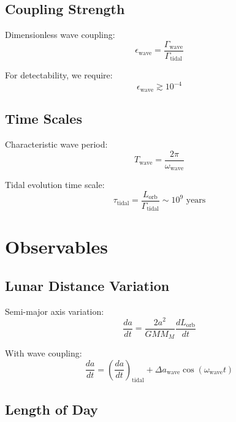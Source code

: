 \documentclass[12pt,a4paper]{article}
\begin{document}
\subsection{Coupling Strength}

Dimensionless wave coupling:
\begin{equation}
\epsilon_{\text{wave}} = \frac{\Gamma_{\text{wave}}}{\Gamma_{\text{tidal}}}
\label{eq:coupling_strength}
\end{equation}

For detectability, we require:
\begin{equation}
\epsilon_{\text{wave}} \gtrsim 10^{-4}
\label{eq:detectability}
\end{equation}

\subsection{Time Scales}

Characteristic wave period:
\begin{equation}
T_{\text{wave}} = \frac{2\pi}{\omega_{\text{wave}}}
\label{eq:wave_period}
\end{equation}

Tidal evolution time scale:
\begin{equation}
\tau_{\text{tidal}} = \frac{L_{\text{orb}}}{\Gamma_{\text{tidal}}} \sim 10^9 \text{ years}
\label{eq:tidal_timescale}
\end{equation}

\section{Observables}

\subsection{Lunar Distance Variation}

Semi-major axis variation:
\begin{equation}
\frac{da}{dt} = \frac{2a^2}{GMM_M} \frac{dL_{\text{orb}}}{dt}
\label{eq:distance_variation}
\end{equation}

With wave coupling:
\begin{equation}
\frac{da}{dt} = \left(\frac{da}{dt}\right)_{\text{tidal}} + \Delta a_{\text{wave}} \cos(\omega_{\text{wave}} t)
\label{eq:distance_with_wave}
\end{equation}

\subsection{Length of Day}
\end{document}
